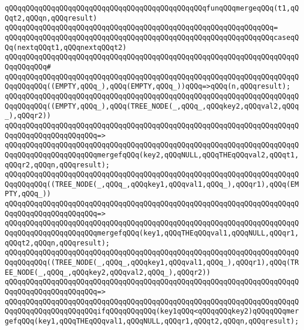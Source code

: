 \verb|qQQqqQQqqQQqqQQqqQQqqQQqqQQqqQQqqQQqqQQqqQQqqQQqfunqQQqmergeqQQq(t1,qQQqt2,qQQqn,qQQqresult)|\newline
\verb|qQQqqQQqqQQqqQQqqQQqqQQqqQQqqQQqqQQqqQQqqQQqqQQqqQQqqQQqqQQqqQQq=|\newline
\verb|qQQqqQQqqQQqqQQqqQQqqQQqqQQqqQQqqQQqqQQqqQQqqQQqqQQqqQQqqQQqqQQqcaseqQQq(nextqQQqt1,qQQqnextqQQqt2)|\newline
\verb|qQQqqQQqqQQqqQQqqQQqqQQqqQQqqQQqqQQqqQQqqQQqqQQqqQQqqQQqqQQqqQQqqQQqqQQqqQQqqQQq#|\newline
\verb|qQQqqQQqqQQqqQQqqQQqqQQqqQQqqQQqqQQqqQQqqQQqqQQqqQQqqQQqqQQqqQQqqQQqqQQqqQQqqQQq((EMPTY,qQQq_),qQQq(EMPTY,qQQq_))qQQq=>qQQq(n,qQQqresult);|\newline
\newline
\verb|qQQqqQQqqQQqqQQqqQQqqQQqqQQqqQQqqQQqqQQqqQQqqQQqqQQqqQQqqQQqqQQqqQQqqQQqqQQqqQQq((EMPTY,qQQq_),qQQq(TREE_NODE(_,qQQq_,qQQqkey2,qQQqval2,qQQq_),qQQqr2))|\newline
\verb|qQQqqQQqqQQqqQQqqQQqqQQqqQQqqQQqqQQqqQQqqQQqqQQqqQQqqQQqqQQqqQQqqQQqqQQqqQQqqQQqqQQqqQQqqQQq=>|\newline
\verb|qQQqqQQqqQQqqQQqqQQqqQQqqQQqqQQqqQQqqQQqqQQqqQQqqQQqqQQqqQQqqQQqqQQqqQQqqQQqqQQqqQQqqQQqqQQqmergefqQQq(key2,qQQqNULL,qQQqTHEqQQqval2,qQQqt1,qQQqr2,qQQqn,qQQqresult);|\newline
\newline
\verb|qQQqqQQqqQQqqQQqqQQqqQQqqQQqqQQqqQQqqQQqqQQqqQQqqQQqqQQqqQQqqQQqqQQqqQQqqQQqqQQq((TREE_NODE(_,qQQq_,qQQqkey1,qQQqval1,qQQq_),qQQqr1),qQQq(EMPTY,qQQq_))|\newline
\verb|qQQqqQQqqQQqqQQqqQQqqQQqqQQqqQQqqQQqqQQqqQQqqQQqqQQqqQQqqQQqqQQqqQQqqQQqqQQqqQQqqQQqqQQqqQQq=>|\newline
\verb|qQQqqQQqqQQqqQQqqQQqqQQqqQQqqQQqqQQqqQQqqQQqqQQqqQQqqQQqqQQqqQQqqQQqqQQqqQQqqQQqqQQqqQQqqQQqmergefqQQq(key1,qQQqTHEqQQqval1,qQQqNULL,qQQqr1,qQQqt2,qQQqn,qQQqresult);|\newline
\newline
\verb|qQQqqQQqqQQqqQQqqQQqqQQqqQQqqQQqqQQqqQQqqQQqqQQqqQQqqQQqqQQqqQQqqQQqqQQqqQQqqQQq((TREE_NODE(_,qQQq_,qQQqkey1,qQQqval1,qQQq_),qQQqr1),qQQq(TREE_NODE(_,qQQq_,qQQqkey2,qQQqval2,qQQq_),qQQqr2))|\newline
\verb|qQQqqQQqqQQqqQQqqQQqqQQqqQQqqQQqqQQqqQQqqQQqqQQqqQQqqQQqqQQqqQQqqQQqqQQqqQQqqQQqqQQqqQQqqQQq=>|\newline
\verb|qQQqqQQqqQQqqQQqqQQqqQQqqQQqqQQqqQQqqQQqqQQqqQQqqQQqqQQqqQQqqQQqqQQqqQQqqQQqqQQqqQQqqQQqqQQqifqQQqqQQqqQQq(key1qQQq<qQQqqQQqkey2)qQQqqQQqmergefqQQq(key1,qQQqTHEqQQqval1,qQQqNULL,qQQqr1,qQQqt2,qQQqn,qQQqresult);|\newline
